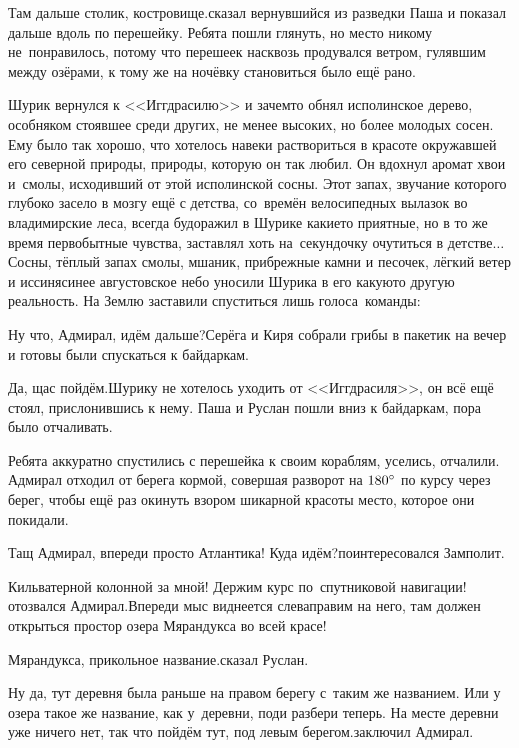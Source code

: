 \diagdash Там дальше столик, костровище.\mdash сказал вернувшийся из разведки Паша и показал дальше вдоль по перешейку. Ребята пошли глянуть, но место никому не~понравилось, потому что перешеек насквозь продувался ветром, гулявшим между озёрами, к тому же на ночёвку становиться было ещё рано. 

Шурик вернулся к <<Иггдрасилю>> и зачем\sdash то обнял исполинское дерево, особняком стоявшее среди других, не менее высоких, но более молодых сосен. Ему было так хорошо, что хотелось навеки раствориться в красоте окружавшей его северной природы, природы, которую он так любил. Он вдохнул аромат хвои и~смолы, исходивший от этой исполинской сосны. Этот запах, звучание которого глубоко засело в мозгу ещё с детства, со~времён велосипедных вылазок во владимирские леса, всегда будоражил в Шурике какие\sdash то приятные, но в то же время первобытные чувства, заставлял хоть на~секундочку очутиться в детстве$\ldots$ Сосны, тёплый запах смолы, мшаник, прибрежные камни и песочек, лёгкий ветер и иссиня\sdash синее августовское небо уносили Шурика в его какую\sdash то другую реальность. На Землю заставили спуститься лишь голоса~команды:

\diagdash Ну что, Адмирал, идём дальше?\mdash Серёга и Киря собрали грибы в пакетик на вечер и готовы были спускаться к байдаркам.

\diagdash Да, щас пойдём.\mdash Шурику не хотелось уходить от <<Иггдрасиля>>, он всё ещё стоял, прислонившись к нему. Паша и Руслан пошли вниз к байдаркам, пора было отчаливать.

Ребята аккуратно спустились с перешейка к своим кораблям, уселись, отчалили. Адмирал отходил от берега кормой, совершая разворот на $180\degree$ по курсу через берег, чтобы ещё раз окинуть взором шикарной красоты место, которое они покидали. 

\diagdash Тащ Адмирал, впереди просто Атлантика! Куда идём?\mdash поинтересовался Замполит.

\diagdash Кильватерной колонной за мной! Держим курс по~спутниковой навигации!\mdash отозвался Адмирал.\mdash Впереди мыс виднеется слева\mdash правим на него, там должен открыться простор озера Мярандукса во всей красе!

\diagdash Мярандукса, прикольное название.\mdash сказал Руслан.

\diagdash Ну да, тут деревня была раньше на правом берегу с~таким же названием. Или у озера такое же название, как у~деревни, поди разбери теперь. На месте деревни уже ничего нет, так что пойдём тут, под левым берегом.\mdash заключил Адмирал.

